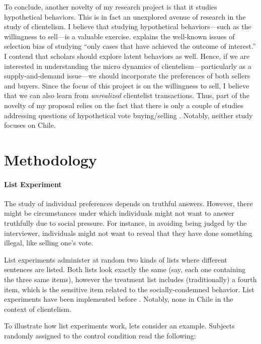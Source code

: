 \documentclass[onesided]{article}\usepackage[]{graphicx}\usepackage[]{color}
\begin{document}
To conclude, another novelty of my research project is that it studies hypothetical behaviors. This is in fact an unexplored avenue of research in the study of clientelism. I believe that studying hypothetical behaviors---such as the willingness to sell---is a valuable exercise. \textcite[131]{Geddes1990} explains the well-known issues of selection bias of studying ``only cases that have achieved the outcome of interest.'' I contend that scholars should explore latent behaviors as well. Hence, if we are interested in understanding the micro dynamics of clientelism---particularly as a supply-and-demand issue---we should incorporate the preferences of both sellers and buyers. Since the focus of this project is on the willingness to sell, I believe that we can also learn from \emph{unrealized} clientelist transactions. Thus, part of the novelty of my proposal relies on the fact that there is only a couple of studies addressing questions of hypothetical vote buying/selling \parencite{GonzalezOcantos2014,Bahamonde2020a}. Notably, neither study focuses on Chile. 


\section{Methodology}


\paragraph{List Experiment} The study of individual preferences depends on truthful answers. However, there might be circumstances under which individuals might not want to answer truthfully due to social pressure. For instance, in avoiding being judged by the interviewer, individuals might not want to reveal that they have done something illegal, like selling one's vote. 

List experiments administer at random two kinds of lists where different sentences are listed. Both lists look exactly the same (say, each one containing the three same items), however the treatment list includes (traditionally) a fourth item, which is the sensitive item related to the socially-condemned behavior. List experiments have been implemented before \parencite{Corstange2008,Redlawsk2010a,Blair2012,Glynn2013,Imai2014a,KiewietDeJonge2015}. Notably, none in Chile in the context of clientelism. 

To illustrate how list experiments work, lets consider an example. Subjects randomly assigned to the control condition read the following:
\end{document}
